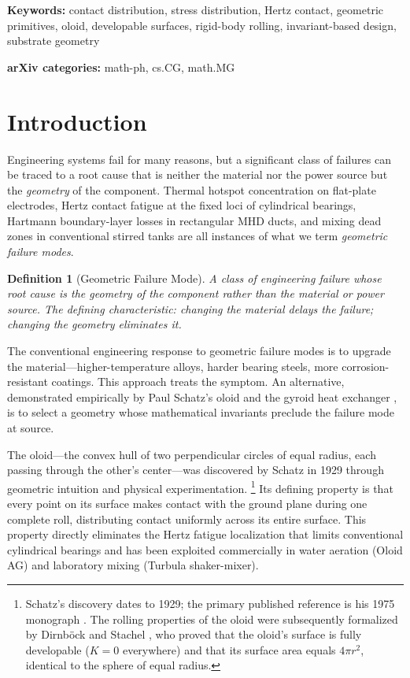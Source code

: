 \documentclass[11pt,a4paper]{article}
\newtheorem{definition}{Definition}
\begin{document}
\medskip
\noindent\textbf{Keywords:} contact distribution, stress distribution,
Hertz contact, geometric primitives, oloid, developable surfaces,
rigid-body rolling, invariant-based design, substrate geometry

\medskip
\noindent\textbf{arXiv categories:} math-ph, cs.CG, math.MG

\tableofcontents


\section{Introduction}

Engineering systems fail for many reasons, but a significant class of
failures can be traced to a root cause that is neither the material
nor the power source but the \emph{geometry} of the component. Thermal
hotspot concentration on flat-plate electrodes, Hertz contact fatigue
at the fixed loci of cylindrical bearings, Hartmann boundary-layer
losses in rectangular MHD ducts, and mixing dead zones in conventional
stirred tanks are all instances of what we term \emph{geometric failure
modes}.

\begin{definition}[Geometric Failure Mode]
A class of engineering failure whose root cause is the geometry of the
component rather than the material or power source. The defining
characteristic: changing the material delays the failure; changing
the geometry eliminates it.
\end{definition}

The conventional engineering response to geometric failure modes is to
upgrade the material---higher-temperature alloys, harder bearing steels,
more corrosion-resistant coatings. This approach treats the symptom.
An alternative, demonstrated empirically by Paul Schatz's oloid
\citep{schatz1975} and the gyroid heat exchanger \citep{al-ketan2018},
is to select a geometry whose mathematical invariants preclude the
failure mode at source.

The oloid---the convex hull of two perpendicular circles of equal radius,
each passing through the other's center---was discovered by Schatz in
1929 through geometric intuition and physical experimentation.%
\footnote{Schatz's discovery dates to 1929; the primary published
reference is his 1975 monograph \citep{schatz1975}. The rolling
properties of the oloid were subsequently formalized by Dirnb{\"o}ck
and Stachel \citep{dirnbock1997}, who proved that the oloid's surface
is fully developable ($K = 0$ everywhere) and that its surface area
equals $4\pi r^2$, identical to the sphere of equal radius.} Its
defining property is that every point on its surface makes contact with
the ground plane during one complete roll, distributing contact uniformly
across its entire surface. This property directly eliminates the Hertz
fatigue localization that limits conventional cylindrical bearings and
has been exploited commercially in water aeration (Oloid AG) and
laboratory mixing (Turbula shaker-mixer).
\end{document}
